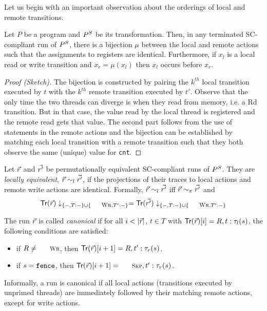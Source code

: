 Let us begin with an important observation about the orderings of local and remote transitions.
\begin{lemma}\label{lem:transformation-bijection}
Let $P$ be a program and $P^S$ be its transformation.
Then, in any terminated SC-compliant run of $P^S$, there is a bijection $\mu$ between the local and remote actions such that the assignments to registers are identical.
Furthermore, if $x_l$ is a local read or write transition and $x_r=\mu(x_l)$ then $x_l$ occurs before $x_r$.
\end{lemma}
\begin{proof}[Proof (Sketch)]
The bijection is constructed by pairing the $k^{th}$ local transition executed by $t$ with the $k^{th}$ remote transition executed by $t'$.
Observe that the only time the two threads can diverge is when they read from memory, i.e. a {\sc\small Rd} transition.
But in that case, the value read by the local thread is registered and the remote read gets that value.
The second part follows from the use of {\aliassume} statements in the remote actions and the bijection can be established by matching each local transition with a remote transition such that they both observe the same (unique) value for {\tt cnt}.
\end{proof}

Let $\vec{r}$ and $\vec{r'}$ be permutationally equivalent SC-compliant runs of $P^S$.
They are {\em locally equivalent}, $\vec{r}\sim_l \vec{r'}$, if the projections of their traces to local actions and remote write actions are identical.
Formally, $\vec{r}\sim_l \vec{r'}$ iff $\vec{r}\sim_{\pi} \vec{r'}$ and
\[
\alitracex {\alisequencex r}\downarrow_{\{-,T:-\}\cup\{\textnormal{\sc\small Wr},T':-\}} = \alitracex {\alisequencex {r'}}\downarrow_{\{-,T:-\}\cup\{\textnormal{\sc\small Wr},T':-\}}
\]

The run $\vec{r}$ is called {\em canonical} if for all $i<|\alisequencex {r}|$, $t\in T$ with $\mathsf{Tr}(\vec{r})[i]=R,t:\tau_{l}(s)$, the following conditions are satisfied:
\begin{itemize}
\item if $R\neq\textnormal{\sc\small Wr}$, then $\mathsf{Tr}(\vec{r})[i+1]=R,t':\tau_{r}(s)$.
\item if $s=\mathtt{fence}$, then $\alitracex {\alisequencex {r}}[i+1]=\textnormal{\sc\small Skp},t':\aliremtransx s$.
\end{itemize}
Informally, a run is canonical if all local actions (transitions executed by unprimed threads) are immediately followed by their matching remote actions, except for write actions.

